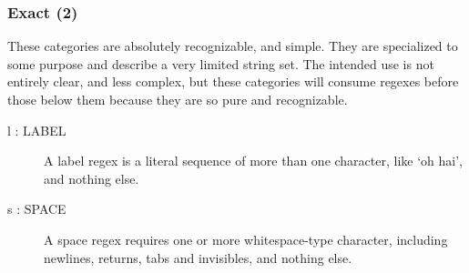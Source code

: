 \subsubsection{Exact (2)}
These categories are absolutely recognizable, and simple.  They are specialized to some purpose and describe a very limited string set.  The intended use is not entirely clear, and less complex, but these categories will consume regexes before those below them because they are so pure and recognizable.
\begin{description}
\item[ l : LABEL ] A label regex is a literal sequence of more than one character, like `oh hai', and nothing else.
\item[ s : SPACE ] A space regex requires one or more whitespace-type character, including newlines, returns, tabs and invisibles, and nothing else.
\end{description}

